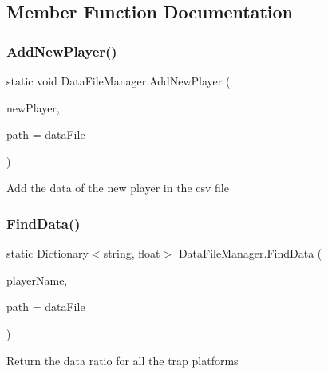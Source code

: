 \subsection{Member Function Documentation}
\mbox{\label{class_data_file_manager_a83fdebc539d60b35d9f59fd74744a6ee}} 
\subsubsection{\texorpdfstring{Add\+New\+Player()}{AddNewPlayer()}}
{\footnotesize\ttfamily static void Data\+File\+Manager.\+Add\+New\+Player (\begin{DoxyParamCaption}\item[{\mbox{\hyperlink{class_player_data}{Player\+Data}}}]{new\+Player,  }\item[{string}]{path = {\ttfamily dataFile} }\end{DoxyParamCaption})\hspace{0.3cm}{\ttfamily [static]}}

Add the data of the new player in the csv file \mbox{\label{class_data_file_manager_a777e64910320c8dbba175e760da4dd0c}} 
\subsubsection{\texorpdfstring{Find\+Data()}{FindData()}}
{\footnotesize\ttfamily static Dictionary$<$string, float$>$ Data\+File\+Manager.\+Find\+Data (\begin{DoxyParamCaption}\item[{string}]{player\+Name,  }\item[{string}]{path = {\ttfamily dataFile} }\end{DoxyParamCaption})\hspace{0.3cm}{\ttfamily [static]}}

Return the data ratio for all the trap platforms \mbox{\label{class_data_file_manager_a4591520b1adccc1d369299d4e1e5242d}} 
